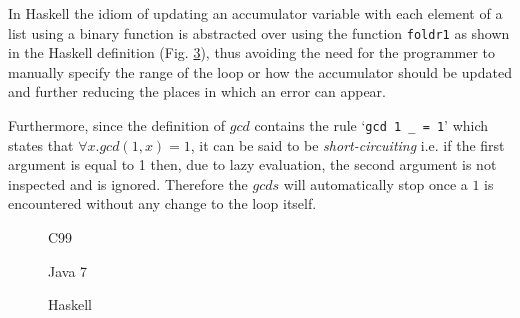 In Haskell the idiom of updating an accumulator variable with each element of a list using a binary function is abstracted over using the function \lstinline|foldr1| as shown in the Haskell definition (Fig. \ref{fig:gcds:haskell}), thus avoiding the need for the programmer to manually specify the range of the loop or how the accumulator should be updated and further reducing the places in which an error can appear.

Furthermore, since the definition of $gcd$ contains the rule `\lstinline|gcd 1 _ = 1|' which states that $\forall x. gcd (1, x) = 1$, it can be said to be \emph{short-circuiting} i.e. if the first argument is equal to 1 then, due to lazy evaluation, the second argument is not inspected and is ignored. Therefore the $gcds$ will automatically stop once a $1$ is encountered without any change to the loop itself.

\begin{figure}

\caption{C99}
\label{fig:gcds:c}
\end{figure}
\begin{figure}

\caption{Java 7}
\label{fig:gcds:java}
\end{figure}
\begin{figure}

\caption{Haskell}
\label{fig:gcds:haskell}
\end{figure}





